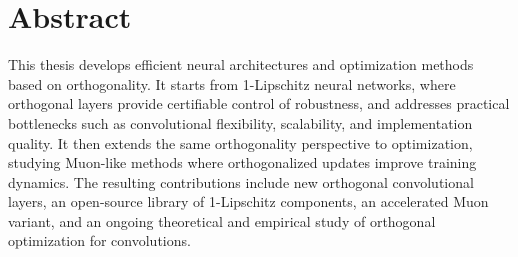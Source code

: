 \chapter*{Abstract}

This thesis develops efficient neural architectures and optimization methods based on orthogonality. It starts from 1-Lipschitz neural networks, where orthogonal layers provide certifiable control of robustness, and addresses practical bottlenecks such as convolutional flexibility, scalability, and implementation quality. It then extends the same orthogonality perspective to optimization, studying Muon-like methods where orthogonalized updates improve training dynamics. The resulting contributions include new orthogonal convolutional layers, an open-source library of 1-Lipschitz components, an accelerated Muon variant, and an ongoing theoretical and empirical study of orthogonal optimization for convolutions.
